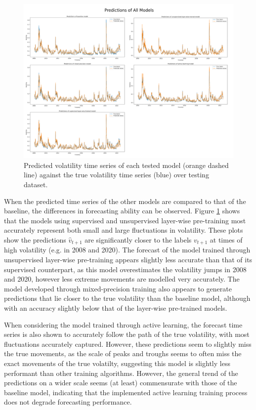 \documentclass[a4paper, 11pt]{report}
\begin{document}
    \begin{figure}[ht]
        \centering
        \includegraphics[width=\textwidth]{results/all-predictions.png}
        \caption{\centering Predicted volatility time series of each tested model (orange dashed line) against the true volatility time series (blue) over testing dataset.}
        \label{fig: predictions}
    \end{figure}

    When the predicted time series of the other models are compared to that of the baseline, the differences in forecasting ability can be observed. Figure \ref{fig: predictions} shows that the models using supervised and unsupervised layer-wise pre-training most accurately represent both small and large fluctuations in volatility. These plots show the predictions $\hat{v}_{t+1}$ are significantly closer to the labels $v_{t+1}$ at times of high volatility (e.g. in 2008 and 2020). The forecast of the model trained through unsupervised layer-wise pre-training appears slightly less accurate than that of its supervised counterpart, as this model overestimates the volatility jumps in 2008 and 2020, however less extreme movements are modelled very accurately. The model developed through mixed-precision training also appears to generate predictions that lie closer to the true volatility than the baseline model, although with an accuracy slightly below that of the layer-wise pre-trained models.

    When considering the model trained through active learning, the forecast time series is also shown to accurately follow the path of the true volatility, with most fluctuations accurately captured. However, these predictions seem to slightly miss the true movements, as the scale of peaks and troughs seems to often miss the exact movements of the true volatilty, suggesting this model is slightly less performant than other training algorithms. However, the general trend of the predictions on a wider scale seems (at least) commensurate with those of the baseline model, indicating that the implemented active learning training process does not degrade forecasting performance.
\end{document}
